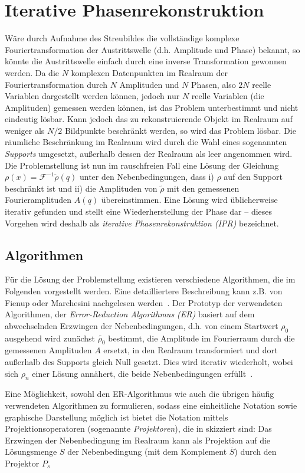 \section{Iterative Phasenrekonstruktion}
Wäre durch Aufnahme des Streubildes die vollständige komplexe Fouriertransformation der Austrittswelle (d.h. Amplitude und Phase) bekannt, so könnte die Austrittswelle einfach durch eine inverse Transformation gewonnen werden. Da die $N$ komplexen Datenpunkten im Realraum der Fouriertransformation durch $N$ Amplituden und $N$ Phasen, also $2N$ reelle Variablen dargestellt werden können, jedoch nur $N$ reelle Variablen (die Amplituden) gemessen werden können, ist das Problem unterbestimmt und nicht eindeutig lösbar. Kann jedoch das zu rekonstruierende Objekt im Realraum auf weniger als $N/2$ Bildpunkte beschränkt werden, so wird das Problem lösbar. Die räumliche Beschränkung im Realraum wird durch die Wahl eines sogenannten \textit{Supports} umgesetzt, außerhalb dessen der Realraum als leer angenommen wird.  
Die Problemstellung ist nun im rauschfreien Fall eine Lösung der Gleichung $\rho(x)=\mathscr{F}^{-1}\tilde{\rho}(q)$ unter den Nebenbedingungen, dass i) $\rho$ auf den Support beschränkt ist und ii) die Amplituden von $\tilde{\rho}$ mit den gemessenen Fourieramplituden $A(q)$ übereinstimmen. Eine Lösung wird üblicherweise iterativ gefunden und stellt eine Wiederherstellung der Phase dar -- dieses Vorgehen wird deshalb als \textit{iterative Phasenrekonstruktion (IPR)} bezeichnet.
\subsection{Algorithmen}
Für die Lösung der Problemstellung existieren verschiedene Algorithmen, die im Folgenden vorgestellt werden. Eine detailliertere Beschreibung kann z.B. von Fienup oder Marchesini nachgelesen werden~\cite{marchesini2007,fienup1982}.
Der Prototyp der verwendeten Algorithmen, der \textit{Error-Reduction Algorithmus (ER)} basiert auf dem abwechselnden Erzwingen der Nebenbedingungen, d.h. von einem Startwert $\rho_0$ ausgehend wird zunächst $\tilde{\rho_0}$ bestimmt, die Amplitude im Fourierraum durch die gemessenen Amplituden $A$ ersetzt, in den Realraum transformiert und dort außerhalb des Supports gleich Null gesetzt. Dies wird iterativ wiederholt, wobei sich $\rho_n$ einer Lösung annähert, die beide Nebenbedingungen erfüllt~\cite{fienup1978}.

Eine Möglichkeit, sowohl den ER-Algorithmus wie auch die übrigen häufig verwendeten Algorithmen zu formulieren, sodass eine einheitliche Notation sowie graphische Darstellung möglich ist bietet die Notation mittels Projektionsoperatoren (sogenannte \textit{Projektoren}), die in  skizziert sind:
Das Erzwingen der Nebenbedingung im Realraum kann als Projektion auf die Lösungsmenge $S$ der Nebenbedingung  (mit dem Komplement $\bar{S}$) durch den Projektor $P_s$ 

